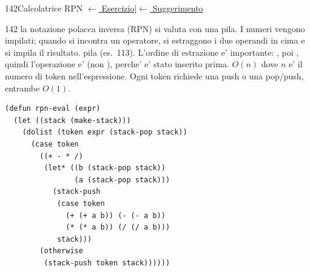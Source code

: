 \label{sol:142}
\begin{solbox}{142}{Calcolatrice RPN}
\small\color{black!55}\hyperref[ex:142]{$\leftarrow$ Esercizio}\enspace\textcolor{black!30}{|}\enspace\hyperref[hint:142]{$\leftarrow$ Suggerimento}\normalsize\color{black}
\begin{ragionamentoBox}{142}
 la notazione polacca inversa (RPN) si valuta con una pila.
I numeri vengono impilati; quando si incontra un operatore,
si estraggono i due operandi in cima e si impila il risultato.
 pila (es.~113). L'ordine di estrazione e'
importante: , poi , quindi l'operazione e' 
(non ), perche'  e' stato inserito prima.
 $O(n)$ dove $n$ e' il numero di token nell'espressione.
Ogni token richiede una push o una pop/push, entrambe $O(1)$.
\end{ragionamentoBox}
\begin{lstlisting}
(defun rpn-eval (expr)
  (let ((stack (make-stack)))
    (dolist (token expr (stack-pop stack))
      (case token
        ((+ - * /)
         (let* ((b (stack-pop stack))
                (a (stack-pop stack)))
           (stack-push
            (case token
              (+ (+ a b)) (- (- a b))
              (* (* a b)) (/ (/ a b)))
            stack)))
        (otherwise
         (stack-push token stack))))))
\end{lstlisting}
\end{solbox}

